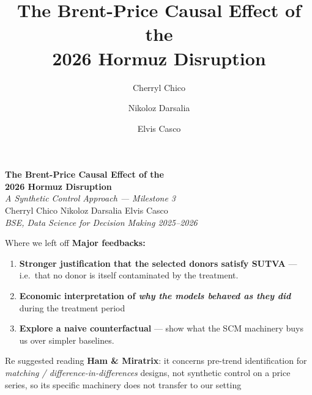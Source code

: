 \documentclass[aspectratio=169,11pt]{beamer}
\title{The Brent-Price Causal Effect of the\\ 2026 Hormuz Disruption}
\subtitle{ }
\author{Cherryl Chico \and Nikoloz Darsalia \and Elvis Casco}
\institute{BSE, Data Science for Decision Making 2025--2026}
\date{}
\newcommand{\smalltext}[1]{{\footnotesize\textcolor{muted}{#1}}}
\newcommand{\hd}[1]{\textbf{#1}}
\begin{document}
{
\begin{frame}[plain]
  \vfill
  \begin{center}
    {\LARGE\bfseries The Brent-Price Causal Effect of the\\[0.2em] 2026 Hormuz Disruption}\\[0.8em]
    {\large\itshape A Synthetic Control Approach --- Milestone 3}\\[2.5em]
    {\normalsize Cherryl Chico \quad Nikoloz Darsalia \quad Elvis Casco}\\[0.3em]
    {\small\itshape\textcolor{muted}{BSE, Data Science for Decision Making 2025--2026}}
  \end{center}
  \vfill
\end{frame}
}

\begin{frame}{Where we left off}
  \vspace{0.6em}
  \hd{Major feedbacks:}
  \vspace{0.3em}
  \begin{enumerate}\setlength\itemsep{0.4em}
    \item[\textcolor{accent}{\hd{1}}] \hd{Stronger justification that the selected donors satisfy SUTVA} ---
      i.e.\ that no donor is itself contaminated by the treatment.
    \item[\textcolor{accent}{\hd{2}}] \hd{Economic interpretation of \emph{why the models behaved as they did}}
      during the treatment period 
    \item[\textcolor{accent}{\hd{3}}] \hd{Explore a naive counterfactual} --- show what the SCM machinery buys us
      over simpler baselines.
  \end{enumerate}

  \vspace{0.5em}
  \smalltext{Re suggested reading \hd{Ham \& Miratrix}: it concerns pre-trend
  identification for \emph{matching / difference-in-differences} designs, not synthetic control on a price
  series, so its specific machinery does not transfer to our setting}

\end{frame}
\end{document}
